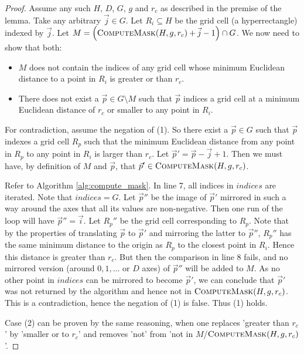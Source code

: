 \begin{proof}
	Assume any such $H$, $D$, $G$, $g$ and $r_c$ as described in the premise of the lemma. 
	Take any arbitrary $\vec{j} \in G$. Let $R_i \subseteq H$ be the grid cell (a hyperrectangle) indexed by $\vec{j}$. Let $M = \left( \textsc{ComputeMask}(H, g, r_c) + \vec{j} - 1 \right) \cap G$. 
	We now need to show that both:
	\begin{itemize}
		\item $M$ does not contain the indices of any grid cell whose minimum Euclidean distance to a point in $R_i$ is greater or than $r_c$.
		\item There does not exist a $\vec{p} \in G \setminus M$ such that $\vec{p}$ indices a grid cell at a minimum Euclidean distance of $r_c$ or smaller to any point in $R_i$.
	\end{itemize}

	For contradiction, assume the negation of (1). So there exist a $\vec{p} \in G$ such that $\vec{p}$ indexes a grid cell $R_p$ such that the minimum Euclidean distance from any point in $R_p$ to any point in $R_i$ is larger than $r_c$. Let $\vec{p}' = \vec{p} - \vec{j} + 1$. Then we must have, by definition of $M$ and $\vec{p}$, that $\vec{p}' \in \textsc{ComputeMask}(H, g, r_c)$. 
	
	Refer to Algorithm \ref{alg:compute_mask}. In line 7, all indices in $indices$ are iterated. Note that $indices = G$. Let $\vec{p}''$ be the image of $\vec{p}'$ mirrored in such a way around the axes that all its values are non-negative. Then one run of the loop will have $\vec{p}'' = \vec{i}$. Let $R_p''$ be the grid cell corresponding to $R_p$. Note that by the properties of translating $\vec{p}$ to $\vec{p}'$ and mirroring the latter to $\vec{p}''$, $R_p''$ has the same minimum distance to the origin as $R_p$ to the closest point in $R_i$. Hence this distance is greater than $r_c$. But then the comparison in line 8 fails, and no mirrored version (around $0, 1, \dots$ or $D$ axes) of $\vec{p}''$ will be added to $M$. As no other point in $indices$ can be mirrored to become $\vec{p}'$, we can conclude that $\vec{p}'$ was not returned by the algorithm and hence not in $\textsc{ComputeMask}(H, g, r_c)$. This is a contradiction, hence the negation of (1) is false. Thus (1) holds.
	
	Case (2) can be proven by the same reasoning, when one replaces 'greater than $r_c$' by 'smaller or to $r_c$' and removes 'not' from 'not in $M$/$\textsc{ComputeMask}(H, g, r_c)$'.
\end{proof}

